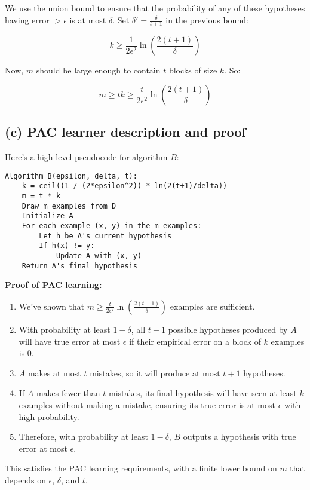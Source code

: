 \documentclass{article}
\begin{document}
We use the union bound to ensure that the probability of any of these hypotheses having error $> \epsilon$ is at most $\delta$. Set $\delta' = \frac{\delta}{t+1}$ in the previous bound:

\[k \geq \frac{1}{2\epsilon^2} \ln\left(\frac{2(t+1)}{\delta}\right)\]

Now, $m$ should be large enough to contain $t$ blocks of size $k$. So:

\[m \geq tk \geq \frac{t}{2\epsilon^2} \ln\left(\frac{2(t+1)}{\delta}\right)\]

\subsection*{(c) PAC learner description and proof}
Here's a high-level pseudocode for algorithm $B$:

\begin{verbatim}
Algorithm B(epsilon, delta, t):
    k = ceil((1 / (2*epsilon^2)) * ln(2(t+1)/delta))
    m = t * k
    Draw m examples from D
    Initialize A
    For each example (x, y) in the m examples:
        Let h be A's current hypothesis
        If h(x) != y:
            Update A with (x, y)
    Return A's final hypothesis
\end{verbatim}

\textbf{Proof of PAC learning:}

\begin{enumerate}
    \item We've shown that $m \geq \frac{t}{2\epsilon^2} \ln\left(\frac{2(t+1)}{\delta}\right)$ examples are sufficient.
    \item With probability at least $1-\delta$, all $t+1$ possible hypotheses produced by $A$ will have true error at most $\epsilon$ if their empirical error on a block of $k$ examples is 0.
    \item $A$ makes at most $t$ mistakes, so it will produce at most $t+1$ hypotheses.
    \item If $A$ makes fewer than $t$ mistakes, its final hypothesis will have seen at least $k$ examples without making a mistake, ensuring its true error is at most $\epsilon$ with high probability.
    \item Therefore, with probability at least $1-\delta$, $B$ outputs a hypothesis with true error at most $\epsilon$.
\end{enumerate}

This satisfies the PAC learning requirements, with a finite lower bound on $m$ that depends on $\epsilon$, $\delta$, and $t$.
\end{document}
